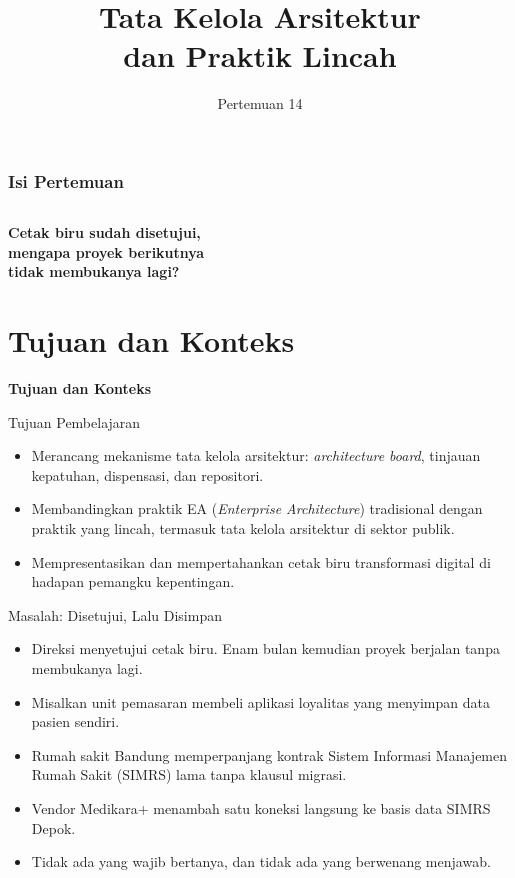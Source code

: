 \documentclass[aspectratio=169, table, 12pt]{beamer}
\title{\Huge Tata Kelola Arsitektur\\ \vspace{10pt} dan Praktik Lincah}
\date{Pertemuan 14}
\begin{document}
\frame{\titlepage}

\begin{frame}
  \frametitle{Isi Pertemuan}
  \vspace{14pt}
  \begin{columns}[t]
    {\small\tableofcontents[sections={1-4}]}

    {\small\tableofcontents[sections={5-7}]}
  \end{columns}
\end{frame}

\begin{frame}{\hfill}
  \centering
  \Huge{\textbf{Cetak biru sudah disetujui,\\mengapa proyek berikutnya\\tidak membukanya lagi?}}
\end{frame}

\section{Tujuan dan Konteks}

\begin{frame}{\hfill}
  \centering
  \Huge{\textbf{Tujuan dan Konteks}}
\end{frame}

\begin{frame}{{\Large Tujuan Pembelajaran}}
  \vspace{10pt}
  \begin{itemize}
    \item Merancang mekanisme tata kelola arsitektur: \textit{architecture board}, tinjauan kepatuhan,
          dispensasi, dan repositori.
    \item Membandingkan praktik EA (\textit{Enterprise Architecture}) tradisional dengan praktik yang
          lincah, termasuk tata kelola arsitektur di sektor publik.
    \item Mempresentasikan dan mempertahankan cetak biru transformasi digital di hadapan pemangku
          kepentingan.
  \end{itemize}
\end{frame}

\begin{frame}{{\Large Masalah: Disetujui, Lalu Disimpan}}
  \small
  \vspace{6pt}
  \begin{itemize}
    \item Direksi menyetujui cetak biru. Enam bulan kemudian proyek berjalan tanpa membukanya lagi.
    \item Misalkan unit pemasaran membeli aplikasi loyalitas yang menyimpan data pasien sendiri.
    \item Rumah sakit Bandung memperpanjang kontrak Sistem Informasi Manajemen Rumah Sakit (SIMRS) lama
          tanpa klausul migrasi.
    \item Vendor Medikara+ menambah satu koneksi langsung ke basis data SIMRS Depok.
    \item Tidak ada yang wajib bertanya, dan tidak ada yang berwenang menjawab.
  \end{itemize}
\end{frame}
\end{document}
